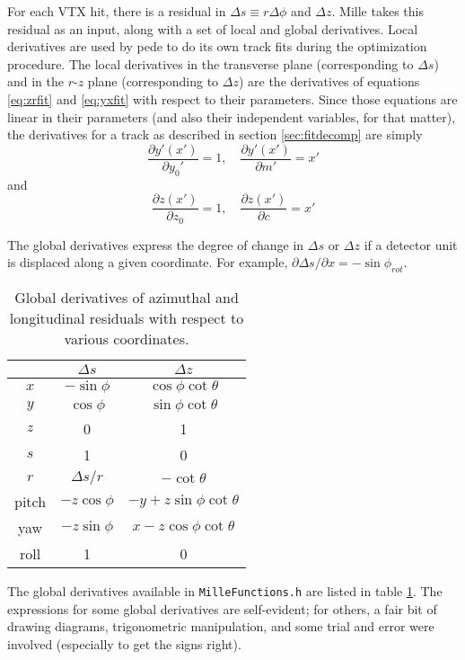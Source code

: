 \documentclass[12pt]{article}
\begin{document}
For each VTX hit, there is a residual in $\Delta s \equiv r\Delta\phi$ and $\Delta z$. Mille takes this residual as an input, along with a set of local and global derivatives. Local derivatives are used by pede to do its own track fits during the optimization procedure. The local derivatives in the transverse plane (corresponding to $\Delta s$) and in the $r$-$z$ plane (corresponding to $\Delta z$) are the derivatives of equations \ref{eq:zrfit} and \ref{eq:yxfit} with respect to their parameters. Since those equations are linear in their parameters (and also their independent variables, for that matter), the derivatives for a track as described in section \ref{sec:fitdecomp} are simply
\begin{equation} \label{eq:sderlc}
\frac{\partial y'(x')}{\partial y_0'} = 1, \quad 
\frac{\partial y'(x')}{\partial m'} = x' 
\end{equation}
and
\begin{equation} \label{eq:zderlc}
\frac{\partial z(x')}{\partial z_0} = 1, \quad 
\frac{\partial z(x')}{\partial c} = x' 
\end{equation}

The global derivatives express the degree of change in $\Delta s$ or $\Delta z$ if a detector unit is displaced along a given coordinate. For example, $\partial \Delta s / \partial x = -\sin \phi_{rot}$. 
\begin{table}[htb!] \label{tab:dergl}
\centering
\begin{tabular}{c | c | c }
 & $\Delta s$ & $\Delta z$ \\
\hline
$x$ & $-\sin \phi$ & $\cos \phi \cot \theta$ \\
$y$ & $ \cos \phi$ & $\sin \phi \cot \theta$ \\
$z$ & 0 & 1 \\
$s$ & 1 & 0 \\
$r$ & $\Delta s / r$ & $-\cot \theta$ \\
pitch & $-z \cos \phi$ & $-y + z \sin \phi \cot \theta$ \\
yaw & $-z \sin \phi$ & $x - z \cos \phi \cot \theta$ \\
roll & 1 & 0 \\
\hline
\end{tabular}
\caption{Global derivatives of azimuthal and longitudinal residuals with respect to various coordinates.}
\end{table}
The global derivatives available in \texttt{MilleFunctions.h} are listed in table \ref{tab:dergl}. The expressions for some global derivatives are self-evident; for others, a fair bit of drawing diagrams, trigonometric manipulation, and some trial and error were involved (especially to get the signs right).
\end{document}
